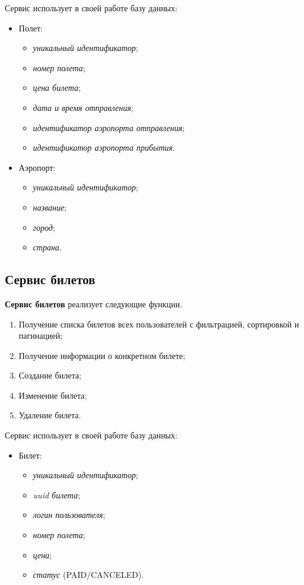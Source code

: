 Сервис использует в своей работе базу данных:
\begin{itemize}
  \item Полет:
  \begin{itemize}
    \item \textit{уникальный идентификатор};
    \item \textit{номер полета};
    \item \textit{цена билета};
    \item \textit{дата и время отправления};
    \item \textit{идентификатор аэропорта отправления};
    \item \textit{идентификатор аэропорта прибытия}.
  \end{itemize}

  \item Аэропорт:
  \begin{itemize}
    \item \textit{уникальный идентификатор};
    \item \textit{название};
    \item \textit{город};
    \item \textit{страна}.
  \end{itemize}
\end{itemize}


\subsection{Сервис билетов}

\textbf{Сервис билетов} реализует следующие функции.
\begin{enumerate}
	\item Получение списка билетов всех пользователей с фильтрацией, сортировкой и пагинацией;
	\item Получение информации о конкретном билете;
	\item Создание билета;
	\item Изменение билета;
	\item Удаление билета.
\end{enumerate}

Сервис использует в своей работе базу данных:
\begin{itemize}
  \item Билет:
  \begin{itemize}
    \item \textit{уникальный идентификатор};
    \item \textit{uuid билета};
    \item \textit{логин пользователя};
    \item \textit{номер полета};
    \item \textit{цена};
    \item \textit{статус} (PAID/CANCELED).
  \end{itemize}
\end{itemize}


